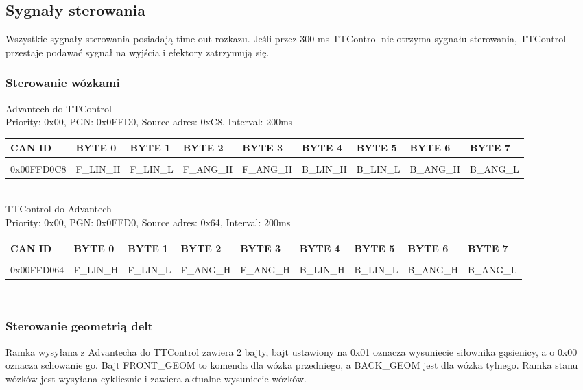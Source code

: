 \documentclass{article}
\begin{document}
\subsection{Sygnały sterowania}
Wszystkie sygnały sterowania posiadają time-out rozkazu. Jeśli przez 300 ms TTControl nie otrzyma sygnału sterowania, TTControl przestaje podawać sygnał na wyjścia i efektory zatrzymują się. 
\subsubsection{Sterowanie wózkami}

Advantech do TTControl\\
Priority: 0x00, PGN: 0x0FFD0, Source adres: 0xC8, Interval: 200ms\\
\begin{left}
\begin{tabular}{ |p{2cm}|p{1.5cm}|p{1.5cm}|p{1.5cm}|p{1.5cm}|p{1.5cm}|p{1.5cm}|p{1.5cm}|p{1.5cm}|} 
 \hline
 CAN ID & BYTE 0 & BYTE 1 & BYTE 2 & BYTE 3 & BYTE 4 & BYTE 5 & BYTE 6 & BYTE 7\\ \hline
 & & & & & & & &\\
0x00FFD0C8 & F\_LIN\_H & F\_LIN\_L & F\_ANG\_H & F\_ANG\_H & B\_LIN\_H & B\_LIN\_L & B\_ANG\_H & B\_ANG\_L\\ 
 \hline
\end{tabular}
\end{left}\\

TTControl do Advantech\\
Priority: 0x00, PGN: 0x0FFD0, Source adres: 0x64, Interval: 200ms\\
\begin{left}
\begin{tabular}{ |p{2cm}|p{1.5cm}|p{1.5cm}|p{1.5cm}|p{1.5cm}|p{1.5cm}|p{1.5cm}|p{1.5cm}|p{1.5cm}|} 
 \hline
 CAN ID & BYTE 0 & BYTE 1 & BYTE 2 & BYTE 3 & BYTE 4 & BYTE 5 & BYTE 6 & BYTE 7\\ \hline
 & & & & & & & &\\
0x00FFD064 & F\_LIN\_H & F\_LIN\_L & F\_ANG\_H & F\_ANG\_H & B\_LIN\_H & B\_LIN\_L & B\_ANG\_H & B\_ANG\_L\\ 
 \hline
\end{tabular}
\end{left}\\

\subsubsection{Sterowanie geometrią delt}
Ramka wysyłana z Advantecha do TTControl zawiera 2 bajty, bajt ustawiony na 0x01 oznacza wysuniecie siłownika gąsienicy, a o 0x00 oznacza schowanie go. Bajt FRONT\_GEOM to komenda dla wózka przedniego, a BACK\_GEOM jest dla wózka tylnego. Ramka stanu wózków jest wysyłana cyklicznie i zawiera aktualne wysuniecie wózków.\\
\end{document}
